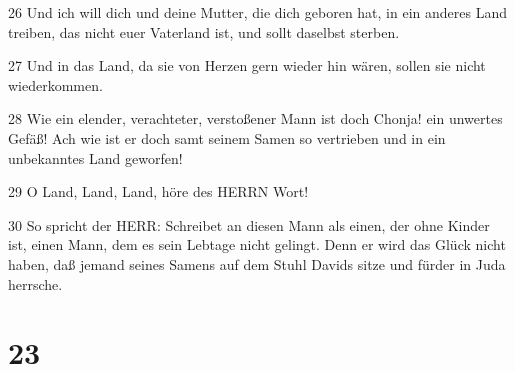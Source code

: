 \par 26 Und ich will dich und deine Mutter, die dich geboren hat, in ein anderes Land treiben, das nicht euer Vaterland ist, und sollt daselbst sterben.
\par 27 Und in das Land, da sie von Herzen gern wieder hin wären, sollen sie nicht wiederkommen.
\par 28 Wie ein elender, verachteter, verstoßener Mann ist doch Chonja! ein unwertes Gefäß! Ach wie ist er doch samt seinem Samen so vertrieben und in ein unbekanntes Land geworfen!
\par 29 O Land, Land, Land, höre des HERRN Wort!
\par 30 So spricht der HERR: Schreibet an diesen Mann als einen, der ohne Kinder ist, einen Mann, dem es sein Lebtage nicht gelingt. Denn er wird das Glück nicht haben, daß jemand seines Samens auf dem Stuhl Davids sitze und fürder in Juda herrsche.

\chapter{23}

